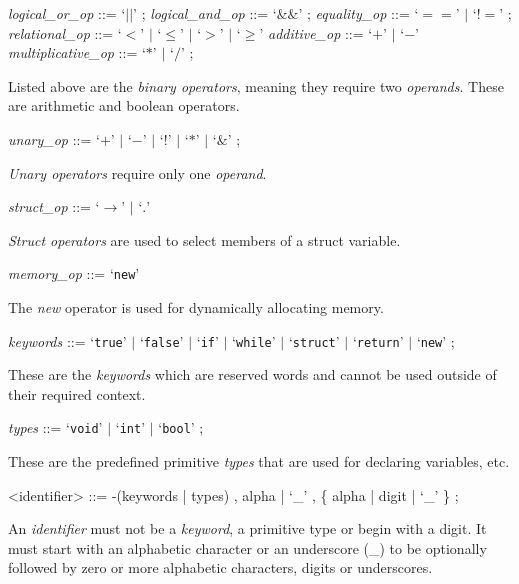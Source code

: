 \documentclass[a4paper,11pt]{article}
\begin{document}
\noindent\textit{logical\_or\_op} ::=
    `$||$'
    ;
\noindent\textit{logical\_and\_op} ::=
    `$\&\&$'
    ;
\noindent\textit{equality\_op} ::=
    `$==$'
    $|$ `$!=$'
    ;
\noindent\textit{relational\_op} ::=
    `$<$'
    $|$ `$\leq$'
    $|$ `$>$'
    $|$ `$\geq$'
\noindent\textit{additive\_op} ::=
    `$+$'
    $|$ `$-$'
\noindent\textit{multiplicative\_op} ::=
    `$*$'
    $|$ `$/$'
    ;

\noindent Listed above are the \textit{binary operators}, meaning they require two \textit{operands}. These are arithmetic and boolean operators.

\noindent\textit{unary\_op} ::=
    `$+$'
    $|$ `$-$'
    $|$ `$!$'
    $|$ `$*$'
    $|$ `$\&$'
    ;

\noindent\textit{Unary operators} require only one \textit{operand}.

\noindent\textit{struct\_op} ::=
    `$\rightarrow$'
    $|$ `$.$'

\noindent\textit{Struct operators} are used to select members of a struct variable.
    
\noindent\textit{memory\_op} ::=
    `\verb+new+'
    
\noindent The \textit{new} operator is used for dynamically allocating memory.

\noindent\textit{keywords} ::=
    `\verb+true+' $|$ `\verb+false+' $|$ `\verb+if+' $|$ `\verb+while+' $|$ `\verb+struct+' $|$ `\verb+return+' $|$ `\verb+new+'
    ;

\noindent These are the \textit{keywords} which are reserved words and cannot be used outside of their required context.

\noindent\textit{types} ::=
    `\verb+void+' $|$ `\verb+int+' $|$ `\verb+bool+' ;
    
\noindent These are the predefined primitive \textit{types} that are used for declaring variables, etc.

\begin{grammar}
<identifier> ::=
	-(keywords | types) ,
	alpha | `\_' , \{ alpha | digit | `\_' \} ;
\end{grammar}
An \textit{identifier} must not be a \textit{keyword}, a primitive type or begin with a digit. It must start with an alphabetic character or an underscore (\_) to be optionally followed by zero or more alphabetic characters, digits or underscores. 
\end{document}
